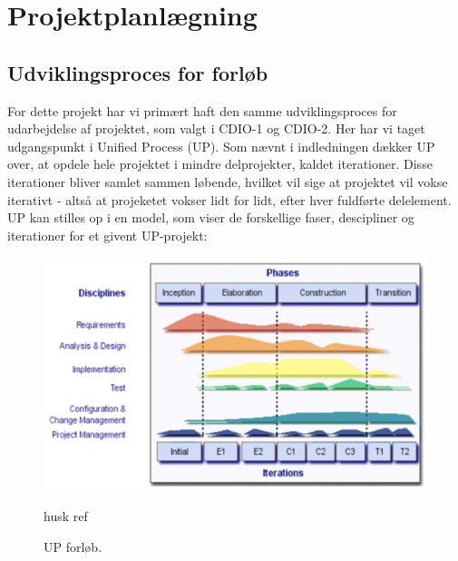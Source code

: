\documentclass[../main.tex]{subfiles}
\begin{document}
\section{Projektplanlægning}


\subsection{Udviklingsproces for forløb}
\begin{flushleft}
   For dette projekt har vi primært haft den samme udviklingsproces for udarbejdelse af projektet, som valgt i CDIO-1 og CDIO-2. Her har vi taget udgangspunkt i Unified Process (UP). Som nævnt i indledningen dækker UP over, at opdele hele projektet i mindre delprojekter, kaldet iterationer. Disse iterationer bliver samlet sammen løbende, hvilket vil sige at projektet vil vokse iterativt - altså at projeketet vokser lidt for lidt, efter hver fuldførte delelement. UP kan stilles op i en model, som viser de forskellige faser, descipliner og iterationer for et givent UP-projekt:
\end{flushleft}

\begin{figure}[H]
    \begin{center}
   {\includegraphics[width=0.48\textheight]{figures/UP-model.png}}
    \caption{UP forløb. \cite{UPModel} } \TODO husk ref
    \end{center}
\end{figure}

\end{document}
